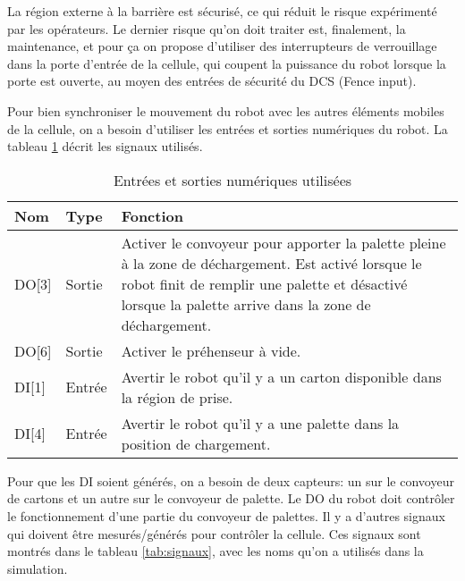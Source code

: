 La région externe à la barrière est sécurisé, ce qui réduit le risque expérimenté par les opérateurs. Le dernier risque qu’on doit traiter est, finalement, la maintenance, et pour ça on propose d’utiliser des interrupteurs de verrouillage dans la porte d’entrée de la cellule, qui coupent la puissance du robot lorsque la porte est ouverte, au moyen des entrées de sécurité du DCS (Fence input). 

\newpage
{}

Pour bien synchroniser le mouvement du robot avec les autres éléments mobiles de la cellule, on a besoin d’utiliser les entrées et sorties numériques du robot. La tableau \ref{tab:in/out} décrit les signaux utilisés.

\begin{table}[H]
	\caption{Entrées et sorties numériques utilisées}
	\label{tab:in/out}
	\begin{tabularx}{\textwidth}{>{\centering\arraybackslash}X|>{\centering\arraybackslash}X|>{\centering\arraybackslash}X}
		
		\textbf{Nom}&
		\textbf{Type}&
		\textbf{Fonction}\\
		\hline
		DO[3]&
		Sortie&
		Activer le convoyeur pour apporter la palette pleine à la zone de déchargement. Est activé lorsque le robot finit de remplir une palette et désactivé lorsque la palette arrive dans la zone de déchargement.\\
		\hline
		
		DO[6]&
		Sortie&
		Activer le préhenseur à vide.\\
		\hline
		DI[1]&
		Entrée&
		Avertir le robot qu’il y a un carton disponible dans la région de prise.\\
		\hline
		DI[4]&
		Entrée&
		Avertir le robot qu’il y a une palette dans la position de chargement.\\
	\end{tabularx}
\end{table}

Pour que les DI soient générés, on a besoin de deux capteurs: un sur le convoyeur de cartons et un autre sur le convoyeur de palette. Le DO du robot doit contrôler le fonctionnement d’une partie du convoyeur de palettes.
Il y a d’autres signaux qui doivent être mesurés/générés  pour contrôler la cellule. Ces signaux sont montrés dans le tableau \ref{tab:signaux}, avec les noms qu’on a utilisés dans la simulation.

